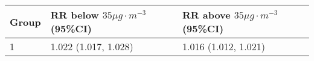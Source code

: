 \begin{tabular}{lll}
  \hline
Group & RR below $35 \mu g \cdot m^{-3}$ (95\%CI) & RR above $35 \mu g \cdot m^{-3}$ (95\%CI) \\ 
  \hline
   1 & 1.022 (1.017, 1.028) & 1.016 (1.012, 1.021) \\ 
   \hline
\end{tabular}

